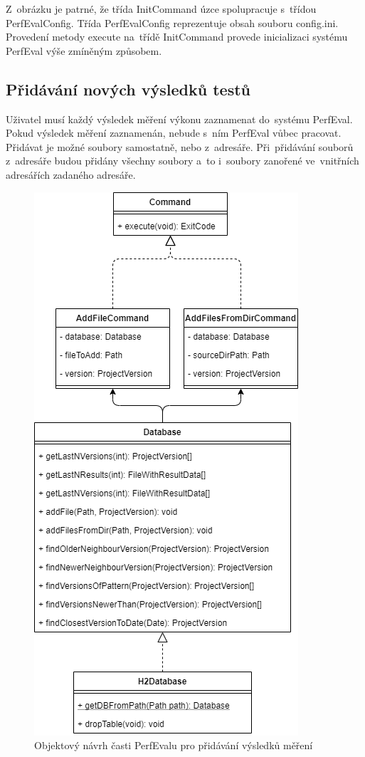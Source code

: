 Z~obrázku je patrné, že třída InitCommand úzce spolupracuje s~třídou PerfEvalConfig. Třída PerfEvalConfig reprezentuje
obsah souboru config.ini. Provedení metody execute na~třídě InitCommand provede inicializaci systému PerfEval výše
zmíněným způsobem.

\subsection{Přidávání nových výsledků testů}

Uživatel musí každý výsledek měření výkonu zaznamenat do~systému PerfEval. Pokud výsledek měření zaznamenán, nebude s~ním
PerfEval vůbec pracovat. Přidávat je možné soubory samostatně, nebo z~adresáře. Při~přidávání souborů z~adresáře budou
přidány všechny soubory a~to i~soubory zanořené ve~vnitřních adresářích zadaného adresáře.

\begin{figure}[h!]
    \centering
    \includegraphics[height=0.5\textheight]{../img/perfeval_h2db.png}
    \caption{Objektový návrh časti PerfEvalu pro přidávání výsledků měření}
\end{figure}

